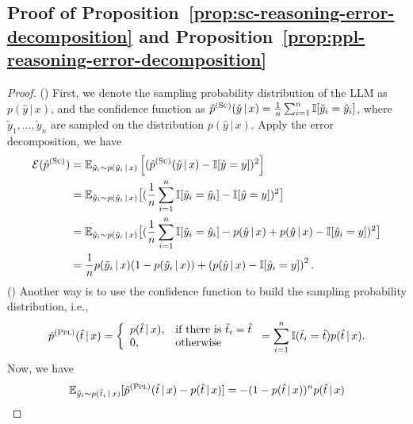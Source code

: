 \subsection{Proof of Proposition~\ref{prop:sc-reasoning-error-decomposition} and Proposition~\ref{prop:ppl-reasoning-error-decomposition}} \label{app:props}
\begin{proof}
  (\SC) First, we denote the sampling probability distribution of the LLM as $p(\hat{y} \,|\, x)$, 
  and the confidence function as $\hat{p}^{(\textsc{Sc})}(\hat{y} \,|\, x) = \frac{1}{n}  \sum_{i=1}^n \mathbb{I}[\tilde{y}_i = \hat{y}_i] $, where $\tilde{y}_1, \dots, \tilde{y}_n$ are sampled on the distribution $p(\hat{y} \,|\, x)$. 
  Apply the error decomposition, we have
  \begin{equation*}
  \begin{aligned}
    \mathcal{E}(\hat{p}^{(\textsc{Sc})}) & =  \mathbb{E}_{\tilde{y}_i \sim {p}(\tilde{y}_i \,|\, x)} \left[( \hat{p}^{(\textsc{Sc})}(\hat{y} \,|\, x) - \mathbb{I}[\hat{y} = y])^2 \right]  \\
    & =  \mathbb{E}_{\tilde{y}_i \sim{p}(\tilde{y}_i \,|\, x)} \big[(\frac{1}{n}  \sum_{i=1}^n \mathbb{I}[\tilde{y}_i = \hat{y}_i] - \mathbb{I}[\hat{y} = y])^2 \big]  \\
    & = \mathbb{E}_{\tilde{y}_i \sim {p}(\tilde{y}_i \,|\, x)} \big[ ( \frac{1}{n}  \sum_{i=1}^n \mathbb{I}[\tilde{y}_i = \hat{y}_i] - p(\hat{y} \,|\, x) + p(\hat{y} \,|\, x) - \mathbb{I}[\hat{y}_i = y]  )^2 \big] \\
    & = \frac{1}{n} {p}(\tilde{y}_i \,|\, x) (1-{p}(\tilde{y}_i \,|\, x)) + \left( p(\hat{y} \,|\, x) - \mathbb{I}[\hat{y}_i = y] \right )^2.
  \end{aligned}
  \end{equation*}
   (\PP) Another way is to use the confidence function to build the sampling probability distribution, 
    i.e., 
    \begin{equation*}
    \hat{p}^{(\textsc{Ppl})}(\hat{t} \,|\, x) = \left\{
        \begin{array}{ll}
            p(\hat{t} \,|\, x), & \text{if}~ \text{there is}~\tilde{t}_i = \hat{t} \\
            0, & \text{otherwise}
        \end{array}
    \right. 
    = \sum_{i=1}^n \mathbb{I}(\tilde{t}_i = \hat{t})p(\hat{t} \,|\, x).
    \end{equation*}
    Now, we have
    \begin{equation*}
    \begin{aligned}
        & \E_{\tilde{y}_i \sim {p}(\tilde{t}_i \,|\, x)} [ \hat{p}^{(\PP)}(\hat{t} \,|\, x) - p(\hat{t} \,|\, x)]  = -(1 - p(\hat{t} \,|\, x)) ^ n p(\hat{t} \,|\, x) \\

\end{aligned}
\end{equation*}
\end{proof}
